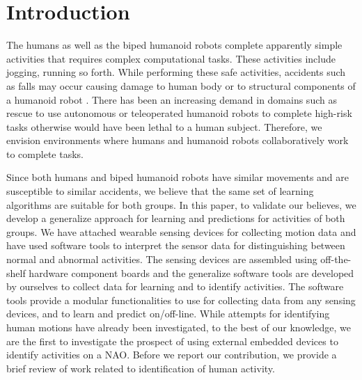 \documentclass[letterpaper]{article}
\begin{document}
\section{Introduction}
\label{sec:Intro}
The humans as well as the biped humanoid robots complete apparently simple activities that requires 
complex computational tasks. These activities include jogging, running so forth. While performing 
these safe activities, accidents such as falls may occur causing damage to human body or to 
structural components of a humanoid robot \cite{li2009accurate}. There has been an 
increasing demand in domains such as rescue to use autonomous or teleoperated humanoid robots to 
complete high-risk tasks otherwise would have been lethal to a human subject. Therefore, we 
envision environments where humans and humanoid robots collaboratively work to complete 
tasks. 

Since both humans and biped humanoid robots have similar movements and are susceptible to 
similar accidents, we believe that the same set of learning algorithms are suitable for both 
groups. In this paper,  to validate our believes, we develop a generalize approach for learning 
and predictions for activities of both groups.  We have attached wearable sensing devices for 
collecting motion data and have used software tools to interpret the sensor data for distinguishing 
between normal and abnormal activities. The sensing devices are assembled using off-the-shelf 
hardware component boards and the generalize software tools are developed by ourselves to 
collect data for learning and to identify activities. The software tools provide a modular 
functionalities to use for collecting  data from any sensing devices, and to learn and predict 
on/off-line. While attempts for identifying human motions have already been investigated, to the 
best of our knowledge, we are the first to investigate the prospect of using external embedded 
devices to identify activities on a NAO. Before we report our contribution, we provide a brief 
review of work related to identification of human activity.  
\end{document}
